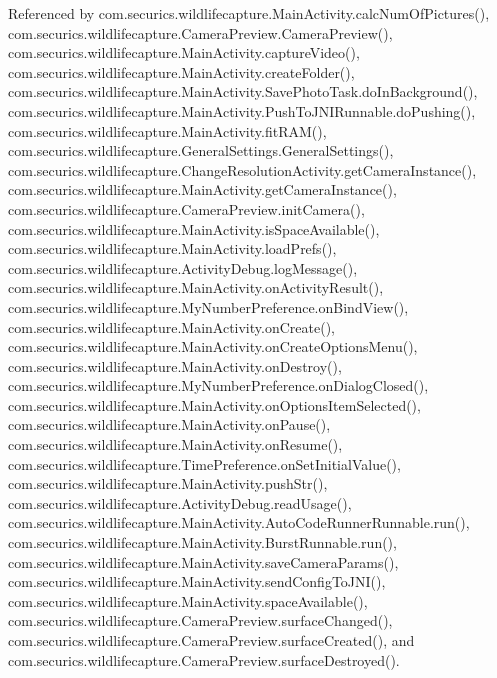 Referenced by com.\+securics.\+wildlifecapture.\+Main\+Activity.\+calc\+Num\+Of\+Pictures(), com.\+securics.\+wildlifecapture.\+Camera\+Preview.\+Camera\+Preview(), com.\+securics.\+wildlifecapture.\+Main\+Activity.\+capture\+Video(), com.\+securics.\+wildlifecapture.\+Main\+Activity.\+create\+Folder(), com.\+securics.\+wildlifecapture.\+Main\+Activity.\+Save\+Photo\+Task.\+do\+In\+Background(), com.\+securics.\+wildlifecapture.\+Main\+Activity.\+Push\+To\+J\+N\+I\+Runnable.\+do\+Pushing(), com.\+securics.\+wildlifecapture.\+Main\+Activity.\+fit\+R\+A\+M(), com.\+securics.\+wildlifecapture.\+General\+Settings.\+General\+Settings(), com.\+securics.\+wildlifecapture.\+Change\+Resolution\+Activity.\+get\+Camera\+Instance(), com.\+securics.\+wildlifecapture.\+Main\+Activity.\+get\+Camera\+Instance(), com.\+securics.\+wildlifecapture.\+Camera\+Preview.\+init\+Camera(), com.\+securics.\+wildlifecapture.\+Main\+Activity.\+is\+Space\+Available(), com.\+securics.\+wildlifecapture.\+Main\+Activity.\+load\+Prefs(), com.\+securics.\+wildlifecapture.\+Activity\+Debug.\+log\+Message(), com.\+securics.\+wildlifecapture.\+Main\+Activity.\+on\+Activity\+Result(), com.\+securics.\+wildlifecapture.\+My\+Number\+Preference.\+on\+Bind\+View(), com.\+securics.\+wildlifecapture.\+Main\+Activity.\+on\+Create(), com.\+securics.\+wildlifecapture.\+Main\+Activity.\+on\+Create\+Options\+Menu(), com.\+securics.\+wildlifecapture.\+Main\+Activity.\+on\+Destroy(), com.\+securics.\+wildlifecapture.\+My\+Number\+Preference.\+on\+Dialog\+Closed(), com.\+securics.\+wildlifecapture.\+Main\+Activity.\+on\+Options\+Item\+Selected(), com.\+securics.\+wildlifecapture.\+Main\+Activity.\+on\+Pause(), com.\+securics.\+wildlifecapture.\+Main\+Activity.\+on\+Resume(), com.\+securics.\+wildlifecapture.\+Time\+Preference.\+on\+Set\+Initial\+Value(), com.\+securics.\+wildlifecapture.\+Main\+Activity.\+push\+Str(), com.\+securics.\+wildlifecapture.\+Activity\+Debug.\+read\+Usage(), com.\+securics.\+wildlifecapture.\+Main\+Activity.\+Auto\+Code\+Runner\+Runnable.\+run(), com.\+securics.\+wildlifecapture.\+Main\+Activity.\+Burst\+Runnable.\+run(), com.\+securics.\+wildlifecapture.\+Main\+Activity.\+save\+Camera\+Params(), com.\+securics.\+wildlifecapture.\+Main\+Activity.\+send\+Config\+To\+J\+N\+I(), com.\+securics.\+wildlifecapture.\+Main\+Activity.\+space\+Available(), com.\+securics.\+wildlifecapture.\+Camera\+Preview.\+surface\+Changed(), com.\+securics.\+wildlifecapture.\+Camera\+Preview.\+surface\+Created(), and com.\+securics.\+wildlifecapture.\+Camera\+Preview.\+surface\+Destroyed().


